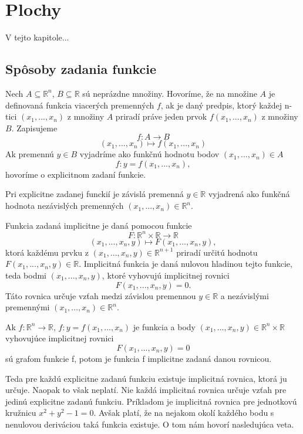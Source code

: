 \chapter{Plochy}

\label{kap:plochy} %

V tejto kapitole...

\section{Spôsoby zadania funkcie}

\begin{definition}
    Nech $A \subseteq \mathbb{R}^n$, $B \subseteq \mathbb{R}$ sú neprázdne množiny. 
Hovoríme, že na množine $A$ je definovaná funkcia viacerých premenných
$f$, ak je daný predpis, ktorý každej n-tici $(x_1, . . . , x_n)$
z množiny $A$ priradí práve jeden prvok $f(x_1, . . . , x_n)$ z množiny $B$.
Zapisujeme 
$$f : A \to B$$
$$(x_1, . . . , x_n) \mapsto f(x_1, . . . , x_n)$$
Ak premennú $y \in B$ vyjadríme ako funkčnú hodnotu bodov $(x_1, . . . , x_n) \in A$
$$f : y = f(x_1, . . . , x_n),$$
hovoríme o explicitnom zadaní funkcie.
\end{definition}


Pri explicitne zadanej funckií je závislá premenná $y \in \mathbb{R}$ vyjadrená ako funkčná hodnota nezávislých
premenných $(x_1, . . . , x_n) \in \mathbb{R}^n$.


Funkcia zadaná implicitne je daná pomocou funkcie $$F : \mathbb{R}^n \times \mathbb{R} \to \mathbb{R}$$
$$(x_1, . . . ,x_n, y) \mapsto F(x_1, . . . , x_n, y),$$ ktorá každému prvku z $(x_1, . . . ,x_n, y) \in \mathbb{R}^{n+1}$ 
priradí určitú hodnotu $F(x_1, . . . , x_n, y) \in \mathbb{R}$. 
Implicitná funkcia je daná nulovou hladinou tejto funkcie, teda bodmi $(x_1, . . . , x_n, y)$, 
ktoré vyhovujú implicitnej rovnici $$F(x_1, . . . , x_n, y) = 0.$$  
Táto rovnica určuje vzťah medzi závislou premennou $y \in \mathbb{R}$
a nezávislými premennými $(x_1, . . . , x_n) \in \mathbb{R}^n$. 

\begin{note}
    Ak $f : \mathbb{R}^n \to \mathbb{R}$, $f: y = f(x_1, . . . , x_n)$ je funkcia a body
    $(x_1, . . . , x_n, y) \in \mathbb{R}^n \times \mathbb{R}$ vyhovujúce implicitnej rovnici 
    $$F(x_1, . . . , x_n, y) = 0$$
    sú grafom funkcie f,
    potom je funkcia f implicitne zadaná danou rovnicou.
\end{note}

Teda pre každú explicitne zadanú funkciu existuje implicitná rovnica, ktorá ju určuje.
Naopak to však neplatí. Nie každá implicitná rovnica určuje vzťah pre jedinú explicitne zadanú
funkciu. Príkladom je implicitná rovnica pre jednotkovú kružnicu $x^2 + y^2 - 1 = 0$. 
Avšak platí, že na nejakom okolí každého bodu s nenulovou deriváciou
taká funkcia existuje. O tom nám hovorí nasledujúca veta.

